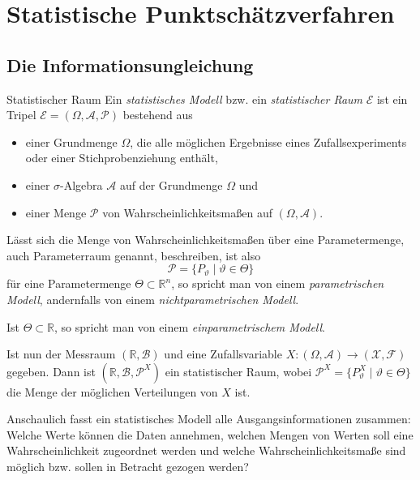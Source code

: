\section{Statistische Punktschätzverfahren}

\subsection{Die Informationsungleichung}

\begin{defi}{Statistischer Raum}
    Ein \emph{statistisches Modell} bzw. ein \emph{statistischer Raum} $\mathcal{E}$ ist ein Tripel $\mathcal {E}=(\Omega,\mathcal{A},\mathcal{P})$ bestehend aus
    \begin{itemize}
        \item einer Grundmenge $\Omega$, die alle möglichen Ergebnisse eines Zufallsexperiments oder einer Stichprobenziehung enthält,
        \item einer $\sigma$-Algebra $\mathcal {A}$ auf der Grundmenge $\Omega$ und
        \item einer Menge $\mathcal {P}$ von Wahrscheinlichkeitsmaßen auf $(\Omega,\mathcal{A})$.
    \end{itemize}

    Lässt sich die Menge von Wahrscheinlichkeitsmaßen über eine Parametermenge, auch Parameterraum genannt, beschreiben, ist also
    \[
        \mathcal{P} = \{ P_{\vartheta} \mid \vartheta \in \Theta \}
    \]
    für eine Parametermenge $\Theta \subset \mathbb{R}^n$, so spricht man von einem \emph{parametrischen Modell}, andernfalls von einem \emph{nichtparametrischen Modell}.

    Ist $\Theta \subset \mathbb{R}$, so spricht man von einem \emph{einparametrischem Modell}.

    Ist nun der Messraum $(\mathbb{R}, \mathcal{B})$ und eine Zufallsvariable $X: (\Omega, \mathcal{A}) \to (\mathcal{X}, \mathcal{F})$ gegeben.
    Dann ist $(\mathbb{R}, \mathcal{B}, \mathcal{P}^X)$ ein statistischer Raum, wobei $\mathcal{P}^X = \{ P_{\vartheta}^X \mid \vartheta \in \Theta \}$ die Menge der möglichen Verteilungen von $X$ ist.

    Anschaulich fasst ein statistisches Modell alle Ausgangsinformationen zusammen:
    Welche Werte können die Daten annehmen, welchen Mengen von Werten soll eine Wahrscheinlichkeit zugeordnet werden und welche Wahrscheinlichkeitsmaße sind möglich bzw. sollen in Betracht gezogen werden?
\end{defi}

